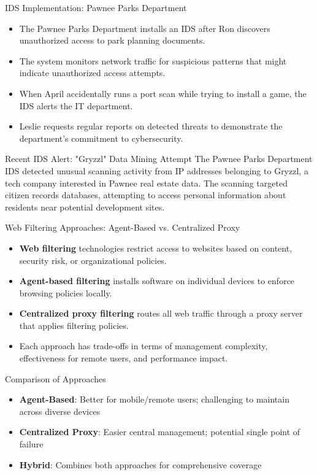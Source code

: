 \documentclass{beamer}
\begin{document}
\begin{frame}{IDS Implementation: Pawnee Parks Department}
\begin{itemize}
\item The Pawnee Parks Department installs an IDS after Ron discovers unauthorized access to park planning documents.
\item The system monitors network traffic for suspicious patterns that might indicate unauthorized access attempts.
\item When April accidentally runs a port scan while trying to install a game, the IDS alerts the IT department.
\item Leslie requests regular reports on detected threats to demonstrate the department's commitment to cybersecurity.
\end{itemize}

\begin{exampleblock}{Recent IDS Alert: "Gryzzl" Data Mining Attempt}
The Pawnee Parks Department IDS detected unusual scanning activity from IP addresses belonging to Gryzzl, a tech company interested in Pawnee real estate data. The scanning targeted citizen records databases, attempting to access personal information about residents near potential development sites.
\end{exampleblock}
\end{frame}

\begin{frame}{Web Filtering Approaches: Agent-Based vs. Centralized Proxy}
\begin{itemize}
\item \textbf{Web filtering} technologies restrict access to websites based on content, security risk, or organizational policies.
\item \textbf{Agent-based filtering} installs software on individual devices to enforce browsing policies locally.
\item \textbf{Centralized proxy filtering} routes all web traffic through a proxy server that applies filtering policies.
\item Each approach has trade-offs in terms of management complexity, effectiveness for remote users, and performance impact.
\end{itemize}

\begin{exampleblock}{Comparison of Approaches}
\begin{itemize}
\item \textbf{Agent-Based}: Better for mobile/remote users; challenging to maintain across diverse devices
\item \textbf{Centralized Proxy}: Easier central management; potential single point of failure
\item \textbf{Hybrid}: Combines both approaches for comprehensive coverage
\end{itemize}
\end{exampleblock}
\end{frame}
\end{document}
